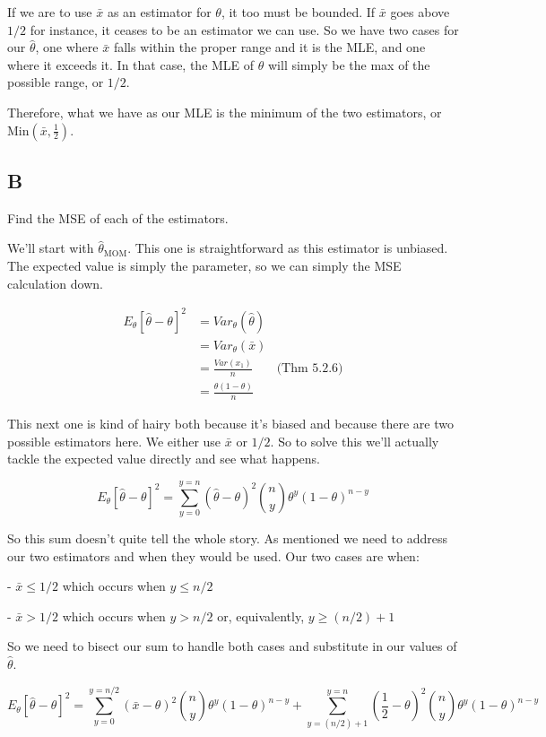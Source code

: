 If we are to use $\bar{x}$ as an estimator for $\theta$, it too must be bounded. If $\bar{x}$ goes above $1/2$ for instance, it ceases to be an estimator we can use. So we have two cases for our $\hat{\theta}$, one where $\bar{x}$ falls within the proper range and it is the MLE, and one where it exceeds it. In that case, the MLE of $\theta$ will simply be the max of the possible range, or $1/2$.

Therefore, what we have as our MLE is the minimum of the two estimators, or $\text{Min}(\bar{x}, \frac{1}{2})$. 

\subsection*{B}

Find the MSE of each of the estimators.

We'll start with $\hat{\theta}_{\text{MOM}}$. This one is straightforward as this estimator is unbiased. The expected value is simply the parameter, so we can simply the MSE calculation down. 

\begin{align*}
	E_{\theta}[\hat{\theta} - \theta]^2 &= Var_{\theta}(\hat{\theta}) \\
	&= Var_{\theta}(\bar{x}) \\
	&= \frac{Var(x_1)}{n} & \text{(Thm 5.2.6)} \\
	&= \frac{\theta(1-\theta)}{n}
\end{align*}

This next one is kind of hairy both because it's biased and because there are two possible estimators here. We either use $\bar{x}$ or $1/2$. So to solve this we'll actually tackle the expected value directly and see what happens. 

\[
	E_{\theta}[\hat{\theta} - \theta]^2 = \sum_{y=0}^{y=n} (\hat{\theta} - \theta)^2 {n \choose y} \theta^y (1-\theta)^{n-y} 
\]

So this sum doesn't quite tell the whole story. As mentioned we need to address our two estimators and when they would be used. Our two cases are when:

- $\bar{x} \leq 1/2$ which occurs when $y \leq n/2$

- $\bar{x} > 1/2$ which occurs when $y > n/2$ or, equivalently, $y \geq (n/2) + 1$

So we need to bisect our sum to handle both cases and substitute in our values of $\hat{\theta}$.

\[
	E_{\theta}[\hat{\theta} - \theta]^2 = 
	\sum_{y=0}^{y=n/2} (\bar{x} - \theta)^2 {n \choose y} \theta^y (1-\theta)^{n-y} +
	\sum_{y=(n/2) + 1}^{y=n} \left(\frac{1}{2} - \theta \right)^2 {n \choose y} \theta^y (1-\theta)^{n-y} 
\]

